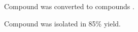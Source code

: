 \documentclass{article}
\newcounter{compound}
\begin{document}

Compound  was converted to compounds
.

Compound  was isolated in 85\% yield.
\end{document}
